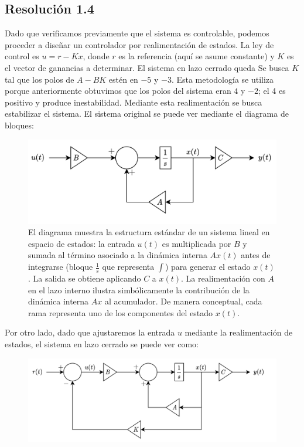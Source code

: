 \documentclass[
  11pt,
  letterpaper,
   addpoints,
   answers
  ]{exam}
\begin{document}
\begin{questions}
\begin{solution}
  \subsection*{Resolución 1.4}
  Dado que verificamos previamente que el sistema es controlable, podemos proceder a diseñar un controlador por realimentación de estados. La ley de control es $u = r - Kx$, donde $r$ es la referencia (aquí se asume constante) y $K$ es el vector de ganancias a determinar. El sistema en lazo cerrado queda
  Se busca $K$ tal que los polos de $A-BK$ estén en $-5$ y $-3$. Esta metodología se utiliza porque anteriormente obtuvimos que los polos del sistema eran $4$ y $-2$; el 4 es positivo y produce inestabilidad. Mediante esta realimentación se busca estabilizar el sistema. El sistema original se puede ver mediante el diagrama de bloques:
  \begin{figure}[H]\centering
    \includegraphics[width=.9\textwidth]{../figures/Auxiliar_4_1.png}
    \caption{El diagrama muestra la estructura estándar de un sistema lineal en espacio de estados: la entrada $u(t)$ es multiplicada por $B$ y sumada al término asociado a la dinámica interna $Ax(t)$ antes de integrarse (bloque $\tfrac{1}{s}$ que representa $\int$) para generar el estado $x(t)$. La salida se obtiene aplicando $C$ a $x(t)$. La realimentación con $A$ en el lazo interno ilustra simbólicamente la contribución de la dinámica interna $Ax$ al acumulador. De manera conceptual, cada rama representa uno de los componentes del estado $x(t)$.}
  \end{figure} 
Por otro lado, dado que ajustaremos la entrada $u$ mediante la realimentación de estados, el sistema en lazo cerrado se puede ver como:
 \begin{figure}[H]\centering
    \includegraphics[width=.9\textwidth]{../figures/Auxiliar_4_2.png}

\end{figure}
\end{solution}
\end{questions}
\end{document}
